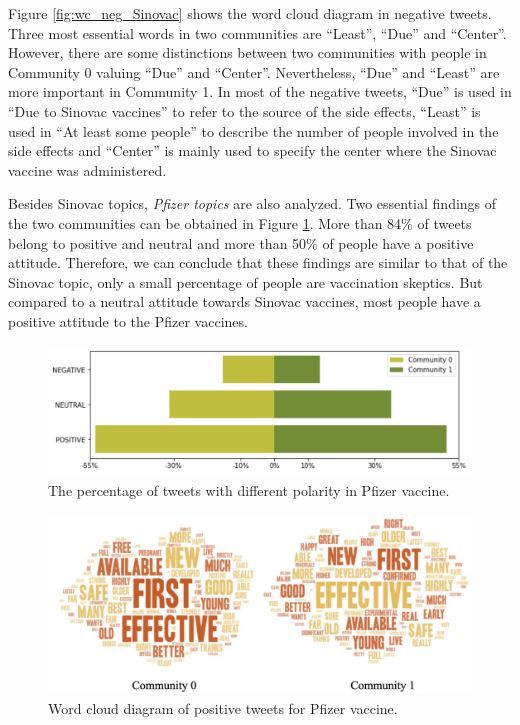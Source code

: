 \documentclass[sigplan,screen]{acmart}
\begin{document}
Figure \ref{fig:wc_neg_Sinovac} shows the word cloud diagram in negative tweets. Three most essential words in two communities are “Least”, “Due” and “Center”. However, there are some distinctions between two communities with people in Community 0 valuing “Due” and “Center”. Nevertheless, “Due” and “Least” are more important in Community 1. In most of the negative tweets, “Due” is used in “Due to Sinovac vaccines” to refer to the source of the side effects,  “Least” is used in “At least some people” to describe the number of people involved in the side effects and “Center” is mainly used to specify the center where the Sinovac vaccine was administered.

Besides Sinovac topics, \textit{Pfizer topics} are also analyzed. Two essential findings of the two communities can be obtained in Figure \ref{fig:pola_pfizer}. More than 84\% of tweets belong to positive and neutral and more than 50\% of people have a positive attitude. Therefore, we can conclude that these findings are similar to that of the Sinovac topic, only a small percentage of people are vaccination skeptics. But compared to a neutral attitude towards Sinovac vaccines, most people have a positive attitude to the Pfizer vaccines.

\begin{figure}[h]
  \centering
  \includegraphics[width=0.8\linewidth]{resource/yidan/Pfizer_sentiment2.jpeg}
  \caption{The percentage of tweets with different polarity in Pfizer vaccine.}
  \label{fig:pola_pfizer}
\end{figure}

\begin{figure}[h]
  \centering
  \includegraphics[width=0.6\linewidth]{resource/yidan/Pfizer_wc_pos.jpeg}
  \caption{Word cloud diagram of positive tweets for Pfizer vaccine.}
  \label{fig:wc_pos_Pfizer}
\end{figure}
\end{document}
